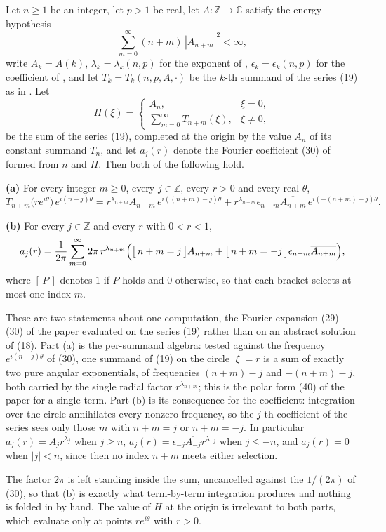 \begin{helper}
Let $n\ge1$ be an integer, let $p>1$ be real, let $A\colon\mathbb{Z}\to\mathbb{C}$
satisfy the energy hypothesis
\[
  \sum_{m=0}^\infty(n+m)\,|A_{n+m}|^2<\infty ,
\]
write $A_k=A(k)$, $\lambda_k=\lambda_k(n,p)$ for the exponent of
, $\epsilon_k=\epsilon_k(n,p)$ for the coefficient of
, and let $T_k=T_k(n,p,A,\cdot)$ be the $k$-th summand of the
series (19) as in .  Let
\[
  H(\xi)=\begin{cases}A_n,&\xi=0,\\[2pt]
    \displaystyle\sum_{m=0}^\infty T_{n+m}(\xi),&\xi\ne0,\end{cases}
\]
be the sum of the series (19), completed at the origin by the value $A_n$ of
its constant summand $T_n$, and let $a_j(r)$ denote the Fourier
coefficient (30) of  formed from $n$ and $H$.  Then
both of the following hold.

\textbf{(a)} For every integer $m\ge0$, every $j\in\mathbb{Z}$, every $r>0$ and
every real $\theta$,
\[
  T_{n+m}\bigl(re^{i\theta}\bigr)\,e^{i(n-j)\theta}
  =r^{\lambda_{n+m}}A_{n+m}\,e^{i((n+m)-j)\theta}
   +r^{\lambda_{n+m}}\epsilon_{n+m}\overline{A_{n+m}}\,
     e^{i(-(n+m)-j)\theta}.
\]

\textbf{(b)} For every $j\in\mathbb{Z}$ and every $r$ with $0<r<1$,
\[
  a_j(r)=\frac1{2\pi}\sum_{m=0}^\infty
    2\pi\,r^{\lambda_{n+m}}
    \Bigl(\bigl[\,n+m=j\,\bigr]A_{n+m}
      +\bigl[\,n+m=-j\,\bigr]\epsilon_{n+m}\overline{A_{n+m}}\Bigr),
\]
where $[\,P\,]$ denotes $1$ if $P$ holds and $0$ otherwise, so that each
bracket selects at most one index $m$.

These are two statements about one computation, the Fourier expansion (29)--(30)
of the paper evaluated on the series (19) rather than on an abstract solution
of (18).  Part (a) is the per-summand algebra: tested against the frequency
$e^{i(n-j)\theta}$ of (30), one summand of (19) on the circle $|\xi|=r$ is a
sum of exactly two pure angular exponentials, of frequencies $(n+m)-j$ and
$-(n+m)-j$, both carried by the single radial factor $r^{\lambda_{n+m}}$; this
is the polar form (40) of the paper for a single term.  Part (b) is its
consequence for the coefficient: integration over the circle annihilates every
nonzero frequency, so the $j$-th coefficient of the series sees only those $m$
with $n+m=j$ or $n+m=-j$.  In particular $a_j(r)=A_jr^{\lambda_j}$ when
$j\ge n$, $a_j(r)=\epsilon_{-j}\overline{A_{-j}}r^{\lambda_{-j}}$ when
$j\le-n$, and $a_j(r)=0$ when $|j|<n$, since then no index $n+m$ meets either
selection.

The factor $2\pi$ is left standing inside the sum, uncancelled against the
$1/(2\pi)$ of (30), so that (b) is exactly what term-by-term integration
produces and nothing is folded in by hand.  The value of $H$ at the origin is
irrelevant to both parts, which evaluate only at points $re^{i\theta}$ with
$r>0$.
\end{helper}

